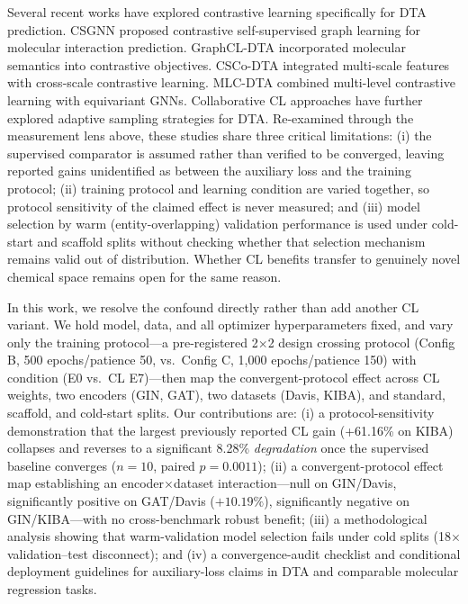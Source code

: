 \documentclass[10pt,a4paper,twocolumn]{article}
\begin{document}
Several recent works have explored contrastive learning specifically for DTA prediction. CSGNN \cite{zhao2021csgnn} proposed contrastive self-supervised graph learning for molecular interaction prediction. GraphCL-DTA \cite{yang2024graphcl} incorporated molecular semantics into contrastive objectives. CSCo-DTA \cite{wang2024csco} integrated multi-scale features with cross-scale contrastive learning. MLC-DTA \cite{zheng2025mlc} combined multi-level contrastive learning with equivariant GNNs. Collaborative CL approaches \cite{tian2024drug} have further explored adaptive sampling strategies for DTA. Re-examined through the measurement lens above, these studies share three critical limitations: (i) the supervised comparator is assumed rather than verified to be converged, leaving reported gains unidentified as between the auxiliary loss and the training protocol; (ii) training protocol and learning condition are varied together, so protocol sensitivity of the claimed effect is never measured; and (iii) model selection by warm (entity-overlapping) validation performance is used under cold-start and scaffold splits without checking whether that selection mechanism remains valid out of distribution. Whether CL benefits transfer to genuinely novel chemical space remains open for the same reason.

In this work, we resolve the confound directly rather than add another CL variant. We hold model, data, and all optimizer hyperparameters fixed, and vary only the training protocol---a pre-registered 2$\times$2 design crossing protocol (Config B, 500 epochs/patience 50, vs.\ Config C, 1{,}000 epochs/patience 150) with condition (E0 vs.\ CL E7)---then map the convergent-protocol effect across CL weights, two encoders (GIN, GAT), two datasets (Davis, KIBA), and standard, scaffold, and cold-start splits. Our contributions are: (i) a protocol-sensitivity demonstration that the largest previously reported CL gain (+61.16\% on KIBA) collapses and reverses to a significant 8.28\% \emph{degradation} once the supervised baseline converges ($n=10$, paired $p=0.0011$); (ii) a convergent-protocol effect map establishing an encoder$\times$dataset interaction---null on GIN/Davis, significantly positive on GAT/Davis ($+10.19\%$), significantly negative on GIN/KIBA---with no cross-benchmark robust benefit; (iii) a methodological analysis showing that warm-validation model selection fails under cold splits (18$\times$ validation--test disconnect); and (iv) a convergence-audit checklist and conditional deployment guidelines for auxiliary-loss claims in DTA and comparable molecular regression tasks.
\end{document}
